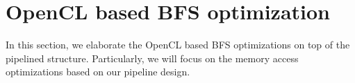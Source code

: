 \section{OpenCL based BFS optimization} \label{sec:bfs-opt}
In this section, we elaborate the OpenCL based BFS optimizations
on top of the pipelined structure. Particularly, we will focus on the 
memory access optimizations based on our pipeline design.

%



